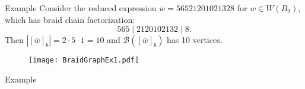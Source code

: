 \documentclass[final]{beamer}
\newcommand{\w}{\overline{w}}
\begin{document}
\begin{frame}{}
\begin{columns}[T]
\begin{column}{.33\linewidth}
\begin{block}{Example}
Consider the reduced expression $\w = 56521201021328$ for $w \in W(B_9)$, which has braid chain factorization:
\[
565\mid 2120102132 \mid 8.
\]
Then $|[\w]_b|=2\cdot 5\cdot 1 =10$ and $\mathcal{B}([\w]_b)$ has 10 vertices.
\begin{figure}
\texttt{[image: BraidGraphEx1.pdf]}
%
%
%
%
%
%
%
%
%
\end{figure}


\end{block}


\begin{block}{Example}


\end{block}
\end{column}
\end{columns}
\end{frame}
\end{document}

